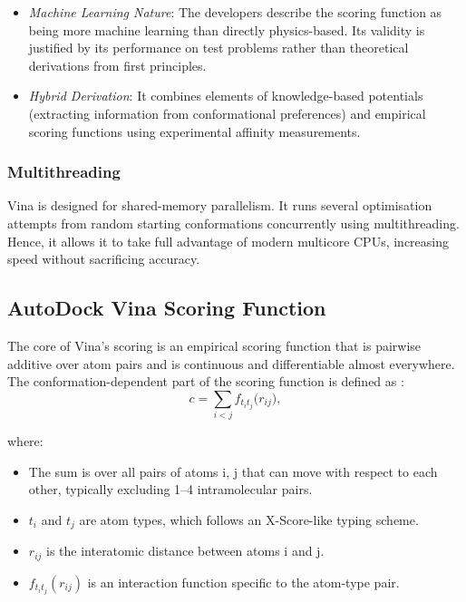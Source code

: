 \documentclass[12pt]{article}
\begin{document}
\begin{itemize}
\item \emph{Machine Learning Nature}: The developers describe the scoring function as being more machine learning than directly physics-based. Its validity is justified by its performance on test problems rather than theoretical derivations from first principles.
\item \emph{Hybrid Derivation}: It combines elements of knowledge-based potentials (extracting information from conformational preferences) and empirical scoring functions using experimental affinity measurements.
\end{itemize}

\subsubsection{Multithreading}
Vina is designed for shared-memory parallelism. It runs several optimisation attempts from random starting conformations concurrently using multithreading. Hence, it allows it to take full advantage of modern multicore CPUs, increasing speed without sacrificing accuracy. 

\subsection{AutoDock Vina Scoring Function}

The core of Vina's scoring is an empirical scoring function that is pairwise additive over atom pairs and is continuous and differentiable almost everywhere. The conformation-dependent part of the scoring function is defined as \cite{CH7_trott2010vina}:
\begin{equation}
  c = \sum_{i < j} f_{t_i t_j}\!\bigl(r_{ij}\bigr),
\end{equation}

where:
\begin{itemize}
  \item The sum is over all pairs of atoms i, j that can move with respect to each other, typically excluding 1–4 intramolecular pairs.
  \item $t_i$ and $t_j$ are atom types, which follows an X-Score-like typing scheme.
  \item $r_{ij}$ is the interatomic distance between atoms i  and j.
  \item $f_{t_i t_j}(r_{ij})$ is an interaction function specific to the atom-type pair.
\end{itemize}
\end{document}
